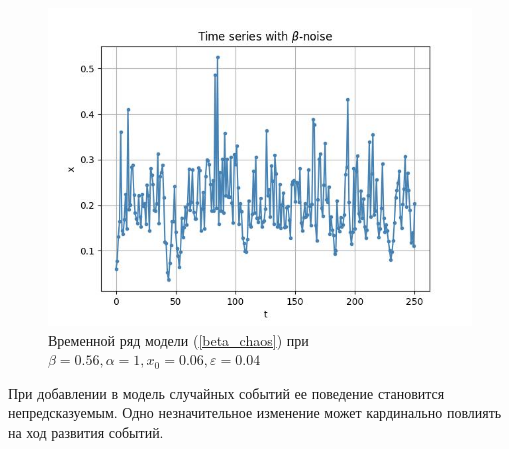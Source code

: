     \begin{figure}
        \centering
        \includegraphics[width=\textwidth]{stochastic/images/time_series_x_0_06_a_1_b_0_56_beta_chaos_epsilon_0_04_alive.jpg}
        
        \captionsetup{justification=centering}
        \caption{Временной ряд модели (\ref{beta_chaos}) при \(\beta = 0.56, \alpha = 1, x_0 = 0.06, \varepsilon = 0.04\)}
        \label{time_series_x_0_06_a_1_b_0_56_beta_chaos_epsilon_0_04_alive}
    \end{figure}

    При добавлении в модель случайных событий ее поведение становится непредсказуемым. Одно незначительное изменение может кардинально повлиять на ход развития событий. 

